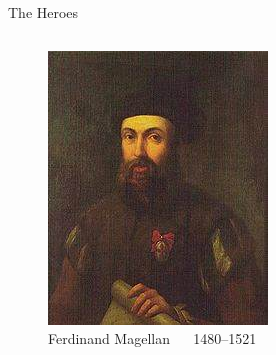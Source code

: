 \documentclass{beamer}
\begin{document}
\begin{frame}{The Heroes}
\begin{columns}
	\begin{figure}[ht]
	\begin{center}
	\includegraphics[width=0.9 \columnwidth]{Magellan.jpg}
	\caption{\tiny Ferdinand Magellan ~~ 1480–1521}
	\end{center}
	\end{figure}
\end{columns}


\end{frame}
\end{document}
